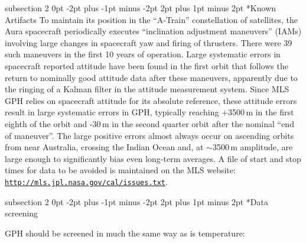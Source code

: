 \documentclass[11pt,draft]{report}
\makeatletter
\renewcommand{\subsection}{\@startsection%
  {subsection}%
  {2}%
  {0pt}%
  {-2pt plus -1pt minus -2pt}%
  {2pt plus 1pt minus 2pt}%
  {\large\sffamily\fontseries{sb}\selectfont\flushleft\color{SectionColor}\figureversion{tabular}}}%
\makeatother
\begin{document}
\subsection*{Known Artifacts}
To maintain its position in the ``A-Train'' constellation of satellites,
the Aura spacecraft periodically executes ``inclination adjustment
maneuvers'' (IAMs) involving large changes in spacecraft yaw and firing
of thrusters.  There were 39 such maneuvers in the first 10 years of
operation.  Large systematic errors in spacecraft reported attitude have
been found in the first orbit that follows the return to nominally good
attitude data after these maneuvers, apparently due to the ringing of a
Kalman filter in the attitude measurement system. Since MLS GPH relies
on spacecraft attitude for its absolute reference, these attitude errors
result in large systematic errors in GPH, typically reaching +3500\,m in
the first eighth of the orbit and -30\,m in the second quarter orbit
after the nominal ``end of maneuver''.  The large positive errors almost
always occur on ascending orbits from near Australia, crossing the
Indian Ocean and, at $\sim$3500\,m amplitude, are large enough to
significantly bias even long-term averages.  A file of start and stop
times for data to be avoided is maintained on the MLS website:
\href{http://mls.jpl.nasa.gov/cal/issues.txt}{\texttt{http://mls.jpl.nasa.gov/cal/issues.txt}}.


\subsection*{Data screening}
\label{sec:GPHScreening}

GPH should be screened in much the same way as is temperature:
\end{document}
